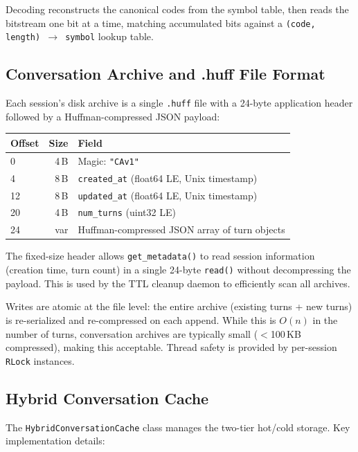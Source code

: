 \documentclass[conference]{IEEEtran}
\begin{document}
Decoding reconstructs the canonical codes from the symbol table, then reads the bitstream one bit at a time, matching accumulated bits against a \texttt{(code, length) $\to$ symbol} lookup table.

\subsection{Conversation Archive and .huff File Format}

Each session's disk archive is a single \texttt{.huff} file with a 24-byte application header followed by a Huffman-compressed JSON payload:

\begin{center}
\begin{tabular}{lrl}
\toprule
\textbf{Offset} & \textbf{Size} & \textbf{Field} \\
\midrule
0 & 4\,B & Magic: \texttt{"CAv1"} \\
4 & 8\,B & \texttt{created\_at} (float64 LE, Unix timestamp) \\
12 & 8\,B & \texttt{updated\_at} (float64 LE, Unix timestamp) \\
20 & 4\,B & \texttt{num\_turns} (uint32 LE) \\
24 & var & Huffman-compressed JSON array of turn objects \\
\bottomrule
\end{tabular}
\end{center}

The fixed-size header allows \texttt{get\_metadata()} to read session information (creation time, turn count) in a single 24-byte \texttt{read()} without decompressing the payload. This is used by the TTL cleanup daemon to efficiently scan all archives.

Writes are atomic at the file level: the entire archive (existing turns + new turns) is re-serialized and re-compressed on each append. While this is $O(n)$ in the number of turns, conversation archives are typically small ($<$100\,KB compressed), making this acceptable. Thread safety is provided by per-session \texttt{RLock} instances.

\subsection{Hybrid Conversation Cache}

The \texttt{HybridConversationCache} class manages the two-tier hot/cold storage. Key implementation details:
\end{document}
